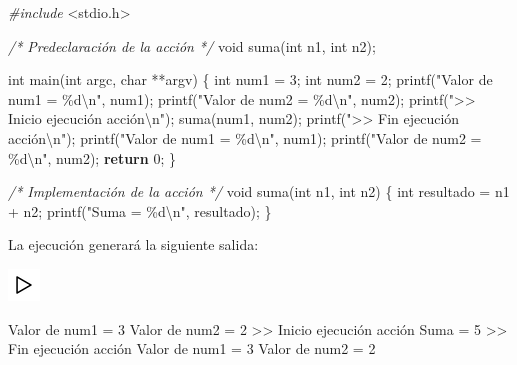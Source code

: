 \documentclass[
]{book}
\newenvironment{Shaded}{\begin{snugshade}}{\end{snugshade}}
\newcommand{\CommentTok}[1]{\textcolor[rgb]{0.56,0.35,0.01}{\textit{#1}}}
\newcommand{\ControlFlowTok}[1]{\textcolor[rgb]{0.13,0.29,0.53}{\textbf{#1}}}
\newcommand{\DataTypeTok}[1]{\textcolor[rgb]{0.13,0.29,0.53}{#1}}
\newcommand{\DecValTok}[1]{\textcolor[rgb]{0.00,0.00,0.81}{#1}}
\newcommand{\ImportTok}[1]{#1}
\newcommand{\NormalTok}[1]{#1}
\newcommand{\PreprocessorTok}[1]{\textcolor[rgb]{0.56,0.35,0.01}{\textit{#1}}}
\newcommand{\SpecialCharTok}[1]{\textcolor[rgb]{0.00,0.00,0.00}{#1}}
\newcommand{\StringTok}[1]{\textcolor[rgb]{0.31,0.60,0.02}{#1}}
\begin{document}
\begin{Shaded}
\begin{Highlighting}[]
\PreprocessorTok{\#include }\ImportTok{\textless{}stdio.h\textgreater{}}

\CommentTok{/* Predeclaración de la acción */}
\DataTypeTok{void}\NormalTok{ suma(}\DataTypeTok{int}\NormalTok{ n1, }\DataTypeTok{int}\NormalTok{ n2);}

\DataTypeTok{int}\NormalTok{ main(}\DataTypeTok{int}\NormalTok{ argc, }\DataTypeTok{char}\NormalTok{ **argv) \{}
    \DataTypeTok{int}\NormalTok{ num1 = }\DecValTok{3}\NormalTok{;}
    \DataTypeTok{int}\NormalTok{ num2 = }\DecValTok{2}\NormalTok{;}
\NormalTok{    printf(}\StringTok{"Valor de num1 = \%d}\SpecialCharTok{\textbackslash{}n}\StringTok{"}\NormalTok{, num1);}
\NormalTok{    printf(}\StringTok{"Valor de num2 = \%d}\SpecialCharTok{\textbackslash{}n}\StringTok{"}\NormalTok{, num2);}
\NormalTok{    printf(}\StringTok{"\textgreater{}\textgreater{} Inicio ejecución acción}\SpecialCharTok{\textbackslash{}n}\StringTok{"}\NormalTok{);}
\NormalTok{    suma(num1, num2);}
\NormalTok{    printf(}\StringTok{"\textgreater{}\textgreater{} Fin ejecución acción}\SpecialCharTok{\textbackslash{}n}\StringTok{"}\NormalTok{);}
\NormalTok{    printf(}\StringTok{"Valor de num1 = \%d}\SpecialCharTok{\textbackslash{}n}\StringTok{"}\NormalTok{, num1);}
\NormalTok{    printf(}\StringTok{"Valor de num2 = \%d}\SpecialCharTok{\textbackslash{}n}\StringTok{"}\NormalTok{, num2);}
    \ControlFlowTok{return} \DecValTok{0}\NormalTok{;}
\NormalTok{\}   }

\CommentTok{/* Implementación de la acción */}
\DataTypeTok{void}\NormalTok{ suma(}\DataTypeTok{int}\NormalTok{ n1, }\DataTypeTok{int}\NormalTok{ n2) \{}
    \DataTypeTok{int}\NormalTok{ resultado = n1 + n2;}
\NormalTok{    printf(}\StringTok{"Suma = \%d}\SpecialCharTok{\textbackslash{}n}\StringTok{"}\NormalTok{, resultado);}
\NormalTok{\}}
\end{Highlighting}
\end{Shaded}

La ejecución generará la siguiente salida:

\includegraphics{./img/play.png}

\begin{Shaded}
\begin{Highlighting}[]
\NormalTok{Valor de num1 = }\DecValTok{3}
\NormalTok{Valor de num2 = }\DecValTok{2}
\NormalTok{\textgreater{}\textgreater{} Inicio ejecución acción}
\NormalTok{Suma = }\DecValTok{5}
\NormalTok{\textgreater{}\textgreater{} Fin ejecución acción}
\NormalTok{Valor de num1 = }\DecValTok{3}
\NormalTok{Valor de num2 = }\DecValTok{2}
\end{Highlighting}
\end{Shaded}
\end{document}
